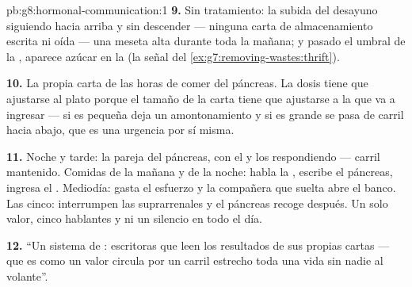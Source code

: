 \begin{solution}{pb:g8:hormonal-communication:1}
\textbf{9.} Sin tratamiento: la subida del desayuno siguiendo hacia
arriba y sin descender --- ninguna carta de almacenamiento escrita ni
oída --- una meseta alta durante toda la mañana; y pasado el umbral de
la , aparece azúcar en la  (la señal del
\cref{ex:g7:removing-wastes:thrift}).

\textbf{10.} La propia carta de las horas de comer del páncreas. La
dosis tiene que ajustarse al plato porque el tamaño de la carta tiene
que ajustarse a la  que va a ingresar --- si es pequeña deja un
amontonamiento y si es grande se pasa de carril hacia abajo, que es una
urgencia por sí misma.

\textbf{11.} Noche y tarde: la pareja del páncreas, con el  y los
 respondiendo --- carril mantenido. Comidas de la mañana y de
la noche: habla la , escribe el páncreas, ingresa el .
Mediodía: gasta el esfuerzo y la compañera que suelta abre el banco.
Las cinco: interrumpen las suprarrenales y el páncreas recoge después.
Un solo valor, cinco hablantes y ni un silencio en todo el día.

\textbf{12.} ``Un sistema de : escritoras que leen los
resultados de sus propias cartas --- que es como un valor circula por
un carril estrecho toda una vida sin nadie al volante''.
\end{solution}

